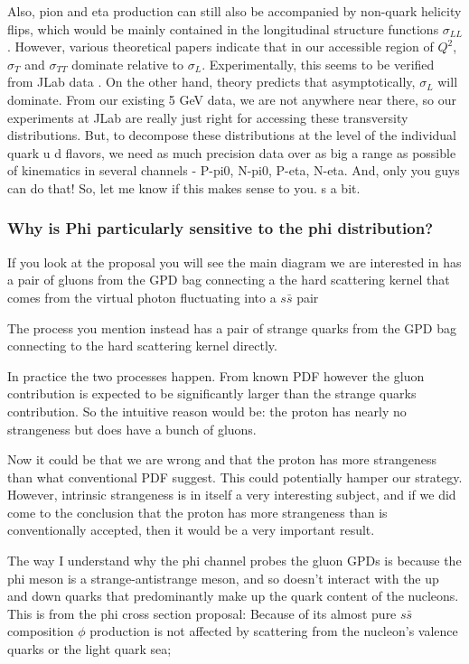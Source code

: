     	Also, pion and eta production can still also be accompanied by non-quark helicity flips, which would be mainly contained in the longitudinal structure functions $\sigma_{LL}$. However, various theoretical papers indicate that in our accessible region of $Q^2$, $\sigma_T$ and $\sigma_{TT}$ dominate relative to $\sigma_L$. Experimentally, this seems to be verified from JLab data .
    	On the other hand, theory predicts that asymptotically, $\sigma_L$ will dominate. From our existing 5 GeV  data, we are not anywhere near there, so our experiments at JLab are really just right for accessing these transversity distributions.  But, to decompose these distributions  at the level of the individual quark u d flavors, we need as much precision data over as big a range as possible of kinematics in several channels - P-pi0, N-pi0, P-eta, N-eta. And, only you guys can do that!
    	So, let me know if this makes sense to you. s a bit. 
    	
        \subsubsection{Why is Phi particularly sensitive to the phi distribution?}

        If you look at the proposal you will see the main diagram we are interested in has a pair of gluons from the GPD bag connecting a the hard scattering kernel that comes from the virtual photon fluctuating into a $s\bar{s}$ pair
        
        The process you mention instead has a pair of strange quarks from the GPD bag connecting to the hard scattering kernel directly. 
        
        In practice the two processes happen. From known PDF however the gluon contribution is expected to be significantly larger than the strange quarks contribution. So the intuitive reason would be: the proton has nearly no strangeness but does have a bunch of gluons.
        
        Now it could be that we are wrong and that the proton has more strangeness than what conventional PDF suggest. This could potentially hamper our strategy. However, intrinsic strangeness is in itself a very interesting subject, and if we did come to the conclusion that the proton has more strangeness than is conventionally accepted, then it would be a very important result.
        
        The way I understand why the phi channel probes the gluon GPDs is because the phi meson is a strange-antistrange meson, and so doesn't interact with the up and down quarks that predominantly make up the quark content of the nucleons. This is from the phi cross section proposal: Because of its almost pure $s\bar{s}$ composition $\phi$ production is not affected by scattering from the nucleon’s valence quarks or the light quark sea;
        
